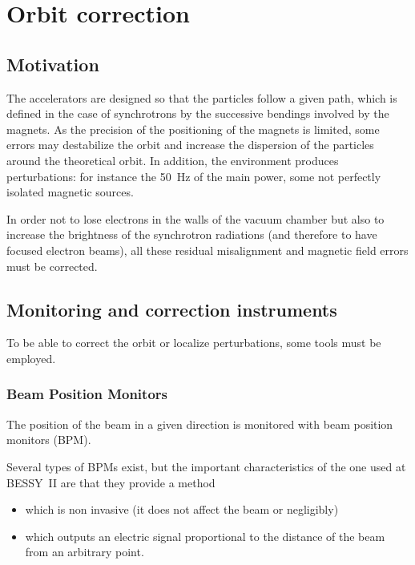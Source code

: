 
\chapter{Orbit correction}
\label{sec:correction}

\section{Motivation}
The accelerators are designed so that the particles follow a given path, which is defined in the case of synchrotrons by the successive bendings involved by the magnets. As the precision of the positioning of the magnets is limited, some errors may destabilize the orbit and increase the dispersion of the particles around the theoretical orbit. In addition, the environment produces perturbations: for instance the 50~Hz of the main power, some not perfectly isolated magnetic sources.

In order not to lose electrons in the walls of the vacuum chamber but also to increase the brightness of the synchrotron radiations (and therefore to have focused electron beams), all these residual misalignment and magnetic field errors must be corrected.



\section{Monitoring and correction instruments}
To be able to correct the orbit or localize perturbations, some tools must be employed.

\subsection{Beam Position Monitors}
The position of the beam in a given direction is monitored with beam position monitors (BPM). 

Several types of BPMs exist, but the important characteristics of the one used at BESSY~II are that they provide a method
\begin{itemize}
	\item which is non invasive (it does not affect the beam or negligibly)
	\item which outputs an electric signal proportional to the distance of the beam from an arbitrary point.
\end{itemize}

